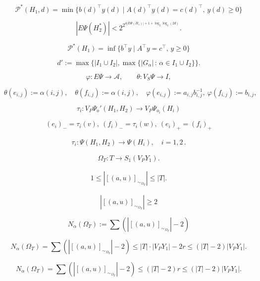 \documentclass[10pt, reqno]{article}
\begin{document}
$$
{\mathcal{P}}^*(H_1, d) = \min \{ b(d)^{\top}  y(d)  \mid A(d)^{\top}y(d) = c(d)^{\top} , \, y(d) \ge 0  \}
$$

$$
| E  \Psi(H_2^*) | < 2^{  2^{4| E  \Psi(H_1) | + 1+ \log_2 \log_2 (2d)  } } .
$$

$$
{\mathcal{P}}^*(H_1)  = \inf \{ b^{\top} y \mid A^{\top} y = c^{\top} , \, y \ge 0  \}
$$

$$
d' := \max\{ |I_1 \cup I_2| , \max\{ |G_{\alpha} | \, : \,   {\alpha} \in I_1 \cup I_2 \} \} .
$$

\begin{equation*}
{\varphi} : E\Psi \to {\mathcal{A}} , \qquad {\theta} :  V_S \Psi \to I ,
\end{equation*}

$$
{\theta}(e_{i,j}) := {\alpha}(i,j),  \quad {\theta}(f_{i,j}) := {\alpha}(i,j) , \quad {\varphi}(e_{i,j}) := a_{i,j}b_{i,j}^{-1},  \  {\varphi}(f_{i,j}) := b_{i,j} ,
$$

$$
\tau_i : V_P \Psi_o'(H_1, H_2) \to V_P \Psi_{o_i}(H_i)
$$

$$
(e_i)_- = \tau_i(v) , \  (f_i)_- = \tau_i(w) ,  \ (e_i)_+ = (f_i)_+
$$

\begin{gather}\label{tau1}
\tau_i :  \Psi(H_1, H_2) \to  \Psi(H_i)  , \quad i=1,2 \, .
\end{gather}

$$
{\Omega}_T : T \to S_1(V_P Y_1) .
$$

\begin{gather}\label{cd1}
1 \le  | [(a, u)]_{ {\sim}_{{\Omega}_T} } | \le |T|   .
\end{gather}

$$
|[ (a, u)  ]_{{\sim}_{{\Omega}_T}} | \ge 2
$$

\begin{equation}\label{Nal}
N_{\alpha} ( {\Omega}_T ) := \sum ( |  [  (a, u) ]_{{\sim}_{{\Omega}_T}} | -2 )
\end{equation}

\begin{equation*}
N_{\alpha} ( {\Omega}_T ) = \sum ( |  [  (a, u) ]_{{\sim}_{{\Omega}_T}} | -2 )  \le
     |T|\cdot |V_P Y_1 | - 2r \le (|T| - 2) |V_P Y_1 | .
\end{equation*}

\begin{equation*}
N_{\alpha} ( {\Omega}_T ) = \sum ( |  [  (a, u) ]_{{\sim}_{{\Omega}_T}} | -2 )  \le
   (|T| -2 ) r   \le (|T| - 2) |V_P Y_1 |  .
\end{equation*}
\end{document}
